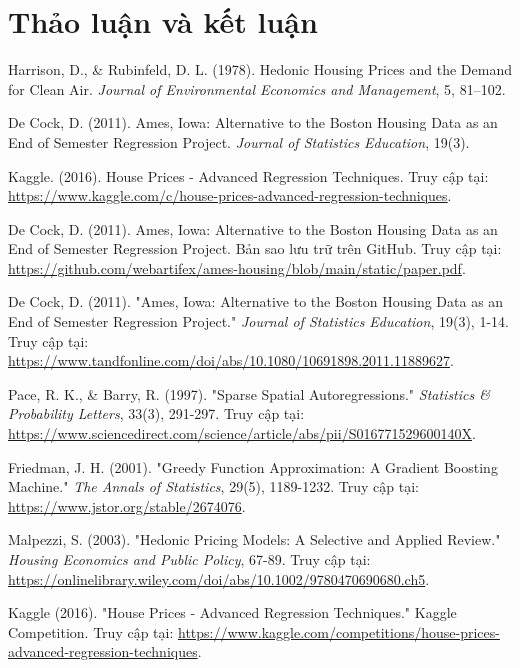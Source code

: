 \documentclass{article}
\begin{document}
\section{Thảo luận và kết luận}

\begin{thebibliography}{9}

Harrison, D., \& Rubinfeld, D. L. (1978). Hedonic Housing Prices and the Demand for Clean Air. \textit{Journal of Environmental Economics and Management}, 5, 81--102.

De Cock, D. (2011). Ames, Iowa: Alternative to the Boston Housing Data as an End of Semester Regression Project. \textit{Journal of Statistics Education}, 19(3).

Kaggle. (2016). House Prices - Advanced Regression Techniques. Truy cập tại: \url{https://www.kaggle.com/c/house-prices-advanced-regression-techniques}.

De Cock, D. (2011). Ames, Iowa: Alternative to the Boston Housing Data as an End of Semester Regression Project. Bản sao lưu trữ trên GitHub. Truy cập tại: \url{https://github.com/webartifex/ames-housing/blob/main/static/paper.pdf}.

De Cock, D. (2011). "Ames, Iowa: Alternative to the Boston Housing Data as an End of Semester Regression Project." \textit{Journal of Statistics Education}, 19(3), 1-14. Truy cập tại: \url{https://www.tandfonline.com/doi/abs/10.1080/10691898.2011.11889627}.

Pace, R. K., \& Barry, R. (1997). "Sparse Spatial Autoregressions." \textit{Statistics \& Probability Letters}, 33(3), 291-297. Truy cập tại: \url{https://www.sciencedirect.com/science/article/abs/pii/S016771529600140X}.

Friedman, J. H. (2001). "Greedy Function Approximation: A Gradient Boosting Machine." \textit{The Annals of Statistics}, 29(5), 1189-1232. Truy cập tại: \url{https://www.jstor.org/stable/2674076}.

Malpezzi, S. (2003). "Hedonic Pricing Models: A Selective and Applied Review." \textit{Housing Economics and Public Policy}, 67-89. Truy cập tại: \url{https://onlinelibrary.wiley.com/doi/abs/10.1002/9780470690680.ch5}.

Kaggle (2016). "House Prices - Advanced Regression Techniques." Kaggle Competition. Truy cập tại: \url{https://www.kaggle.com/competitions/house-prices-advanced-regression-techniques}.

\end{thebibliography}
\end{document}

